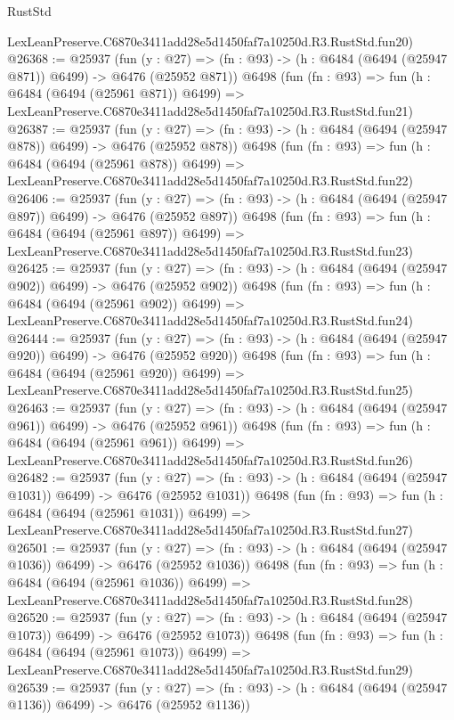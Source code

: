 \begin{lexlean}{RustStd}
\begin{coremodule}
    LexLeanPreserve.C6870e3411add28e5d1450faf7a10250d.R3.RustStd.fun20)
@26368 := @25937
    (fun (y : @27) => (fn : @93) -> (h : @6484 (@6494 (@25947 @871)) @6499) -> @6476 (@25952 @871))
    @6498
    (fun (fn : @93) =>
    fun (h : @6484 (@6494 (@25961 @871)) @6499) =>
    LexLeanPreserve.C6870e3411add28e5d1450faf7a10250d.R3.RustStd.fun21)
@26387 := @25937
    (fun (y : @27) => (fn : @93) -> (h : @6484 (@6494 (@25947 @878)) @6499) -> @6476 (@25952 @878))
    @6498
    (fun (fn : @93) =>
    fun (h : @6484 (@6494 (@25961 @878)) @6499) =>
    LexLeanPreserve.C6870e3411add28e5d1450faf7a10250d.R3.RustStd.fun22)
@26406 := @25937
    (fun (y : @27) => (fn : @93) -> (h : @6484 (@6494 (@25947 @897)) @6499) -> @6476 (@25952 @897))
    @6498
    (fun (fn : @93) =>
    fun (h : @6484 (@6494 (@25961 @897)) @6499) =>
    LexLeanPreserve.C6870e3411add28e5d1450faf7a10250d.R3.RustStd.fun23)
@26425 := @25937
    (fun (y : @27) => (fn : @93) -> (h : @6484 (@6494 (@25947 @902)) @6499) -> @6476 (@25952 @902))
    @6498
    (fun (fn : @93) =>
    fun (h : @6484 (@6494 (@25961 @902)) @6499) =>
    LexLeanPreserve.C6870e3411add28e5d1450faf7a10250d.R3.RustStd.fun24)
@26444 := @25937
    (fun (y : @27) => (fn : @93) -> (h : @6484 (@6494 (@25947 @920)) @6499) -> @6476 (@25952 @920))
    @6498
    (fun (fn : @93) =>
    fun (h : @6484 (@6494 (@25961 @920)) @6499) =>
    LexLeanPreserve.C6870e3411add28e5d1450faf7a10250d.R3.RustStd.fun25)
@26463 := @25937
    (fun (y : @27) => (fn : @93) -> (h : @6484 (@6494 (@25947 @961)) @6499) -> @6476 (@25952 @961))
    @6498
    (fun (fn : @93) =>
    fun (h : @6484 (@6494 (@25961 @961)) @6499) =>
    LexLeanPreserve.C6870e3411add28e5d1450faf7a10250d.R3.RustStd.fun26)
@26482 := @25937
    (fun (y : @27) =>
    (fn : @93) -> (h : @6484 (@6494 (@25947 @1031)) @6499) -> @6476 (@25952 @1031))
    @6498
    (fun (fn : @93) =>
    fun (h : @6484 (@6494 (@25961 @1031)) @6499) =>
    LexLeanPreserve.C6870e3411add28e5d1450faf7a10250d.R3.RustStd.fun27)
@26501 := @25937
    (fun (y : @27) =>
    (fn : @93) -> (h : @6484 (@6494 (@25947 @1036)) @6499) -> @6476 (@25952 @1036))
    @6498
    (fun (fn : @93) =>
    fun (h : @6484 (@6494 (@25961 @1036)) @6499) =>
    LexLeanPreserve.C6870e3411add28e5d1450faf7a10250d.R3.RustStd.fun28)
@26520 := @25937
    (fun (y : @27) =>
    (fn : @93) -> (h : @6484 (@6494 (@25947 @1073)) @6499) -> @6476 (@25952 @1073))
    @6498
    (fun (fn : @93) =>
    fun (h : @6484 (@6494 (@25961 @1073)) @6499) =>
    LexLeanPreserve.C6870e3411add28e5d1450faf7a10250d.R3.RustStd.fun29)
@26539 := @25937
    (fun (y : @27) =>
    (fn : @93) -> (h : @6484 (@6494 (@25947 @1136)) @6499) -> @6476 (@25952 @1136))

\end{coremodule}
\end{lexlean}
